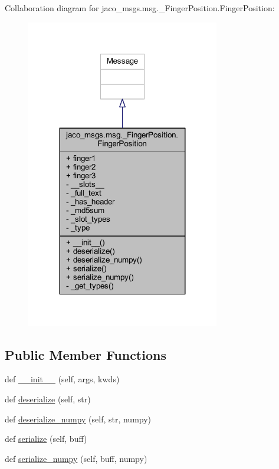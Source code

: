 Collaboration diagram for jaco\+\_\+msgs.\+msg.\+\_\+\+Finger\+Position.\+Finger\+Position\+:
\nopagebreak
\begin{figure}[H]
\begin{center}
\leavevmode
\includegraphics[width=239pt]{d2/d0d/classjaco__msgs_1_1msg_1_1__FingerPosition_1_1FingerPosition__coll__graph}
\end{center}
\end{figure}
\subsection*{Public Member Functions}
\begin{DoxyCompactItemize}
\item 
def \hyperlink{classjaco__msgs_1_1msg_1_1__FingerPosition_1_1FingerPosition_aefef1701d4fe5d7d2c463db912f37350}{\+\_\+\+\_\+init\+\_\+\+\_\+} (self, args, kwds)
\item 
def \hyperlink{classjaco__msgs_1_1msg_1_1__FingerPosition_1_1FingerPosition_ac679007cbbc24035110ff952aa71ce9f}{deserialize} (self, str)
\item 
def \hyperlink{classjaco__msgs_1_1msg_1_1__FingerPosition_1_1FingerPosition_a22f4cbf9d8fb5578c157bc5b168acfe0}{deserialize\+\_\+numpy} (self, str, numpy)
\item 
def \hyperlink{classjaco__msgs_1_1msg_1_1__FingerPosition_1_1FingerPosition_ac25585ac03021af96ad3812d038ed23b}{serialize} (self, buff)
\item 
def \hyperlink{classjaco__msgs_1_1msg_1_1__FingerPosition_1_1FingerPosition_a99a941f632f7b177e47056d9b447473d}{serialize\+\_\+numpy} (self, buff, numpy)
\end{DoxyCompactItemize}
